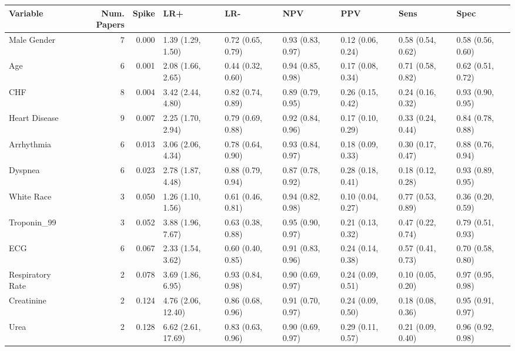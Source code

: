 \begin{table}[ht]
\centering
\begin{tabular}{lrrllllll}
  \hline
Variable & Num. Papers & Spike & LR+ & LR- & NPV & PPV & Sens & Spec \\ 
  \hline
Male Gender &    7 & 0.000 & 1.39 (1.29, 1.50) & 0.72 (0.65, 0.79) & 0.93 (0.83, 0.97) & 0.12 (0.06, 0.24) & 0.58 (0.54, 0.62) & 0.58 (0.56, 0.60) \\ 
  Age &    6 & 0.001 & 2.08 (1.66, 2.65) & 0.44 (0.32, 0.60) & 0.94 (0.85, 0.98) & 0.17 (0.08, 0.34) & 0.71 (0.58, 0.82) & 0.62 (0.51, 0.72) \\ 
  CHF &    8 & 0.004 & 3.42 (2.44, 4.80) & 0.82 (0.74, 0.89) & 0.89 (0.79, 0.95) & 0.26 (0.15, 0.42) & 0.24 (0.16, 0.32) & 0.93 (0.90, 0.95) \\ 
  Heart Disease &    9 & 0.007 & 2.25 (1.70, 2.94) & 0.79 (0.69, 0.88) & 0.92 (0.84, 0.96) & 0.17 (0.10, 0.29) & 0.33 (0.24, 0.44) & 0.84 (0.78, 0.88) \\ 
  Arrhythmia &    6 & 0.013 & 3.06 (2.06, 4.34) & 0.78 (0.64, 0.90) & 0.93 (0.84, 0.97) & 0.18 (0.09, 0.33) & 0.30 (0.17, 0.47) & 0.88 (0.76, 0.94) \\ 
  Dyspnea &    6 & 0.023 & 2.78 (1.87, 4.48) & 0.88 (0.79, 0.94) & 0.87 (0.78, 0.92) & 0.28 (0.18, 0.41) & 0.18 (0.12, 0.28) & 0.93 (0.89, 0.95) \\ 
  White Race &    3 & 0.050 & 1.26 (1.10, 1.56) & 0.61 (0.46, 0.81) & 0.94 (0.82, 0.98) & 0.10 (0.04, 0.27) & 0.77 (0.53, 0.89) & 0.36 (0.20, 0.59) \\ 
  Troponin\_99 &    3 & 0.052 & 3.88 (1.96, 7.67) & 0.63 (0.38, 0.88) & 0.95 (0.90, 0.97) & 0.21 (0.13, 0.32) & 0.47 (0.22, 0.74) & 0.79 (0.51, 0.93) \\ 
  ECG &    6 & 0.067 & 2.33 (1.54, 3.62) & 0.60 (0.40, 0.85) & 0.91 (0.83, 0.96) & 0.24 (0.14, 0.38) & 0.57 (0.41, 0.73) & 0.70 (0.58, 0.80) \\ 
  Respiratory Rate &    2 & 0.078 & 3.69 (1.86, 6.95) & 0.93 (0.84, 0.98) & 0.90 (0.69, 0.97) & 0.24 (0.09, 0.51) & 0.10 (0.05, 0.20) & 0.97 (0.95, 0.98) \\ 
  Creatinine &    2 & 0.124 & 4.76 (2.06, 12.40) & 0.86 (0.68, 0.96) & 0.91 (0.70, 0.97) & 0.24 (0.09, 0.50) & 0.18 (0.08, 0.36) & 0.95 (0.91, 0.97) \\ 
  Urea &    2 & 0.128 & 6.62 (2.61, 17.69) & 0.83 (0.63, 0.96) & 0.90 (0.69, 0.97) & 0.29 (0.11, 0.57) & 0.21 (0.09, 0.40) & 0.96 (0.92, 0.98) \\ 

\end{tabular}
\end{table}

